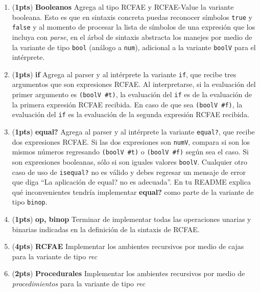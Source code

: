 \documentclass{article}
\newcommand{\grade}[1]{(\textbf{#1pts}) }
\begin{document}
\begin{enumerate}

\item \grade{1} \textbf{Booleanos} Agrega al tipo RCFAE y RCFAE-Value la variante booleana. Esto es que en sintaxis concreta puedas reconocer símbolos \texttt{true} y \texttt{false} y al momento de procesar la lista de símbolos de una expresión que los incluya con \emph{parse}, en el árbol de sintaxis abstracta los manejes por medio de la variante de tipo \texttt{bool} (análogo a \texttt{num}), adicional a la variante \texttt{boolV} para el intérprete. \\

\item \grade{1} \textbf{if} Agrega al parser y al intérprete la variante \texttt{if}, que recibe tres argumentos que son expresiones RCFAE. Al interpretarse, si la evaluación del primer argumento es \texttt{(boolV \#t)}, la evaluación del \texttt{if} es de la evaluación de la primera expresión RCFAE recibida. En caso de que sea \texttt{(boolV \#f)}, la evaluación del \texttt{if} es la evaluación de la segunda expresión RCFAE recibida. \\

\item \grade{1} \textbf{equal?} Agrega al parser y al intérprete la variante \texttt{equal?}, que recibe dos expresiones RCFAE. Si las dos expresiones son \texttt{numV}, compara si son los mismos números regresando \texttt{(boolV \#t)} o \texttt{(boolV \#f)} según sea el caso. Si son expresiones booleanas, sólo si son iguales valores \texttt{boolV}. Cualquier otro caso de uso de \texttt{isequal?} no es válido y debes regresar un mensaje de error que diga ``La aplicación de equal? no es adecuada''. En tu README explica qué inconvenientes tendría implementar \textbf{equal?} como parte de la variante de tipo \texttt{binop}. \\

\item \grade{1} \textbf{op, binop} Terminar de implementar todas las operaciones unarias y binarias indicadas en la definición de la sintaxis de RCFAE. \\

\item \grade{4} \textbf{RCFAE} Implementar los ambientes recursivos por medio de cajas para la variante de tipo \emph{rec} \\

\item \grade{2} \textbf{Procedurales} Implementar los ambientes recursivos por medio de \emph{procedimientos} para la variante de tipo \emph{rec} \\

\end{enumerate}
\end{document}

